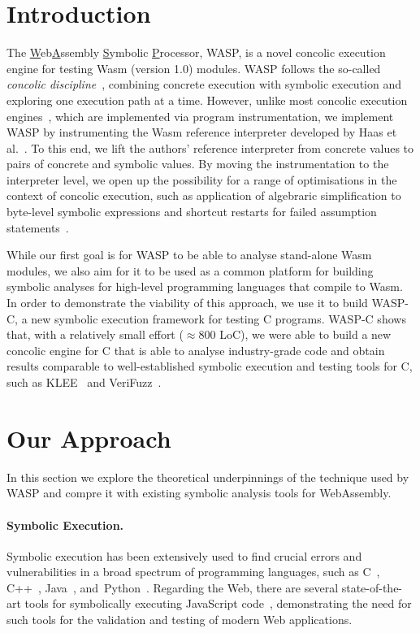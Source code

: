 \section{Introduction}

The \underline{W}eb\underline{A}ssembly \underline{S}ymbolic \underline{P}rocessor, WASP, is a novel concolic execution engine for testing Wasm (version 1.0) modules.
WASP follows the so-called \emph{concolic discipline}~\cite{Godefroid:2005,Sen:2005}, combining concrete execution with symbolic execution and exploring one execution path at a time.
However, unlike most concolic execution engines~\cite{multi-se,you:esop:2021,Sen:2005,sen:cav:2006}, which are implemented via program instrumentation, we implement WASP by instrumenting the Wasm reference interpreter developed by Haas et al.~\cite{Haas:2017}. To this end, we lift the authors' reference interpreter from concrete values to pairs of concrete and symbolic values. 
By moving the instrumentation to the interpreter level, we open up the possibility for a range of optimisations in the context of concolic execution, such as application of algebraric simplification to byte-level symbolic expressions and shortcut restarts for failed assumption statements~\cite{marques:2022}.

While our first goal is for WASP to be able to analyse stand-alone Wasm modules, we also aim for it to be used as a common platform for building symbolic analyses for high-level programming languages that compile to Wasm. In order to demonstrate the viability of this approach, we use it to build WASP-C, a new symbolic execution framework for testing C programs. WASP-C shows that, with a relatively small effort ($\approx800$ LoC), we were able to build a new concolic engine for C that is able to analyse industry-grade code and obtain results comparable to well-established symbolic execution and testing tools for C, such as KLEE~\cite{Cadar:2008} and VeriFuzz~\cite{BasakC:2019}.

\section{Our Approach}

In this section we explore the theoretical underpinnings of the technique used by WASP and compre it with existing symbolic analysis tools for WebAssembly.

\paragraph{Symbolic Execution.}
Symbolic execution has been extensively used to find crucial errors and vulnerabilities in a broad spectrum of programming languages, such as C~\cite{Godefroid:2005}, C++~\cite{Cadar:2008}, Java~\cite{Sen:2005}, and~Python~\cite{Chen:2014}. Regarding the Web, there are several state-of-the-art tools for symbolically executing JavaScript code~\cite{cosette,javert2.0,sym-exec-framework-for-javascript,symjs,multi-se}, demonstrating the need for such tools for the validation and testing of modern Web applications.

